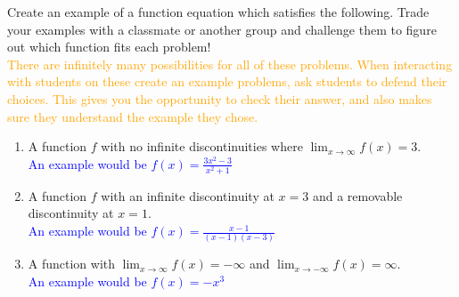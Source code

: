 \documentclass{ximera}
\begin{document}
\begin{exercise}
    

 Create an example of a function equation which satisfies the following.  Trade your examples with a classmate or another group and challenge them to figure out which function fits each problem!\\
 \textcolor{orange}{There are infinitely many possibilities for all of these problems. When interacting with students on these create an example problems, ask students to defend their choices.  This gives you the opportunity to check their answer, and also makes sure they understand the example they chose.}
 \begin{enumerate}
    \item A function $f$ with no infinite discontinuities where $\displaystyle\lim_{x\rightarrow \infty}f(x)=3$. \\
    \textcolor{blue}{ An example would be $f(x)=\frac{3x^2-3}{x^2+1}$}

    \item A function $f$ with an infinite discontinuity at $x=3$ and a removable discontinuity at $x=1$.\\
    \textcolor{blue}{An example would be $f(x)=\frac{x-1}{(x-1)(x-3)}$}
    
    \item A function with $\displaystyle\lim_{x\rightarrow \infty}f(x)=-\infty$ and $\displaystyle\lim_{x\rightarrow -\infty}f(x)=\infty$.\\
    \textcolor{blue}{ An example would be $f(x)=-x^3$}
 \end{enumerate}

\end{exercise}
\end{document}
